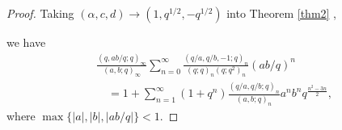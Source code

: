 \documentclass[reqno,12pt]{amsart}
\theoremstyle{remark}
\numberwithin{equation}{section}
\begin{document}
\begin{proof}
Taking $\left(\alpha,c,d\right)\to\left(1,q^{1/2},-q^{1/2}\right)$ into Theorem \ref{thm2} , 

 we have
\begin{align}
&\frac{\left(q,ab/q;q\right)_{\infty}}{\left(a,b;q\right)_{\infty}}
\sum_{n=0}^{\infty}\frac{\left(q/a,q/b,-1;q\right)_{n}}
{\left(q;q\right)_{n}\left(q;q^2\right)_{n}}
\left(ab/q\right)^n\nonumber\\
&\quad=1+\sum_{n=1}^{\infty}\left(1+q^{n}\right)
\frac{\left(q/a,q/b;q\right)_{n}}{\left(a,b;q\right)_{n}}
a^{n}b^{n}q^{\frac{n^2-3n}{2}},\label{C16}
\end{align}
where $\max\{|a|,|b|,|ab/q|\}<1$.


\end{proof}
\end{document}
